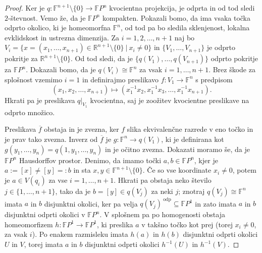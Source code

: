 \documentclass[10pt, a4paper]{article}
\newenvironment{noticeC}{%
  \tcolorbox[%
  notitle,
  empty,
  enhanced,  %
  breakable,
  coltext=black, 
  fontupper=\rmfamily,
  parbox=false,
  noparskip,
  sharp corners,
  boxrule=-1pt,  %
  frame hidden,
  left=7pt,  %
  right=7pt,
  top=5pt,
  bottom=5pt,
  before skip=2.5ex plus 2pt,
  after skip=2.5ex plus 2pt,
  overlay unbroken and last={%
  },
  ]}
{\endtcolorbox}
\newenvironment{dokaz}%
  {\begin{noticeC}\begin{proof}}%
  {\end{proof}\end{noticeC}}
\newcommand{\R}{\mathbb {R}}
\newcommand{\F}{\mathbb {F}}
\begin{document}
\begin{dokaz}
   Ker je $q: \F^{n + 1} \setminus \{0\} \to \F P^n$ kvocientna projekcija, je odprta in od tod sledi $2$-števnost.
   Vemo že, da je $\F P^n$ kompakten. Pokazali bomo, da ima vsaka točka odprto okolico,
   ki je homeomorfna $\F^n$, od tod pa bo sledila sklenjenost, lokalna evklidskost in ustrezna dimenzija.
   Za $i = 1, 2, \dots, n + 1$ naj bo $V_i = \{x = (x_1, \dots, x_{n +1}) \in \R^{n + 1} \setminus \{0\}\ |\ x_i \neq 0 \}$
   in $\{V_1, \dots, V_{n + 1}\}$ je odprto pokritje za $\R^{n + 1} \setminus \{0\}$.
   Od tod sledi, da je $\{q(V_1), \dots, q(V_{n + 1})\}$ odprto pokritje za $\F P^n$.
   Dokazali bomo, da je $q(V_i) \cong \F^n$ za vsak $i = 1, \dots, n + 1$.
   Brez škode za splošnost vzemimo $i = 1$ in definirajmo preslikavo $f: V_1 \to \F^n$
   s predpisom $$(x_1, x_2, \dots, x_{n+ 1}) \mapsto (x_1^{-1} x_2, x_1^{-1} x_3,\dots, x_1^{-1}x_{n + 1}).$$
   Hkrati pa je preslikava $q\big|_{V_1}$ kvocientna, saj je zoožitev kvocientne preslikave na odprto množico.
   \begin{center}
    \adjustbox{scale=1.5,center}{
      \begin{tikzcd}
        V_1 \arrow[r, "f"] \arrow[d, "q |_{V_1}"']
          & \F^{n} \\
        q(V_1) \arrow[ur, dashed, "\overline{f}"']
          & 
      \end{tikzcd}
    }  
  \end{center} 
  Preslikava $\overline{f}$ obstaja in je zvezna, ker $f$ slika ekvivalenčne 
  razrede v eno točko in je prav tako zvezna.
  Inverz od $\overline{f}$ je $g:\F^{n} \to q(V_1)$, ki je definirana kot
  $g(y_1, \dots, y_n) = q(1, y_1, \dots, y_n)$ in je očitno zvezna.
  Dokazati moramo še, da je $\F P^n$ Hausdorffov prostor.
  Denimo, da imamo točki $a, b \in \F P^n$, kjer je $a := [x] \neq [y] =: b$
  in sta $x, y \in \F^{n + 1} \setminus \{0\}$.
  Če so vse koordinate $x_i \neq 0$, potem je $a \in V(q_i)$ za vse $i = 1, \dots, n + 1$.
  Hkrati pa obstaja neko število $j \in \{1, \dots, n + 1\}$, tako da je 
  $b = [y] \in q(V_j)$ za neki $j$; znotraj $q(V_j) \cong \F^n$ imata $a$ in $b$ disjunktni okolici, ker pa velja
  $q(V_j)^{\ \text{odp}} \subseteq \F P^1$ in zato imata $a$ in $b$ disjunktni odprti okolici v $\F P^n$.
  V splošnem pa po homogenosti obstaja homeomorfizem $h: \F P^1 \to \F P^1$,
  ki preslika $a$ v takšno točko kot prej (torej $x_i \neq 0$, za vsak $i$).
  Po enakem razmisleku imata $h(a)$ in $h(b)$ disjunktni odprti okolici $U$ in $V$,
  torej imata $a$ in $b$ disjunktni odprti okolici $h^{-1} (U)$ in $h^{-1} (V)$.
\end{dokaz}
\end{document}
